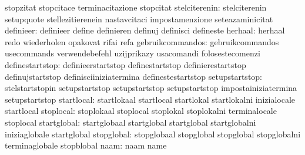                                   stopzitat                        stopcitace
                                  terminacitazione                 stopcitat
                   stelciterenin: stelciterenin                    setupquote
                                  stellezitierenein                nastavcitaci
                                  impostamenzione                  seteazaminicitat
                       definieer: definieer                        define
                                  definieren                       definuj
                                  definisci                        defineste
                         herhaal: herhaal                          redo
                                  wiederholen                      opakovat
                                  rifai                            refa
                gebruikcommandos: gebruikcommandos                 usecommands
                                  verwendebefehl                   uzijprikazy
                                  usacomandi                       folosestecomenzi
                 definestartstop: definieerstartstop               definestartstop
                                  definierestartstop               definujstartstop
                                  definisciiniziatermina           definestestartstop
                  setupstartstop: stelstartstopin                  setupstartstop
                                  setupstartstop                   setupstartstop
                                  impostainiziatermina             setupstartstop
                      startlocal: startlokaal                      startlocal
                                  startlokal                       startlokalni
                                  inizialocale                     startlocal
                       stoplocal: stoplokaal                       stoplocal
                                  stoplokal                        stoplokalni
                                  terminalocale                    stoplocal
                     startglobal: startglobaal                     startglobal
                                  startglobal                      startglobalni
                                  iniziaglobale                    startglobal
                      stopglobal: stopglobaal                      stopglobal
                                  stopglobal                       stopglobalni
                                  terminaglobale                   stopblobal
                            naam: naam                             name
